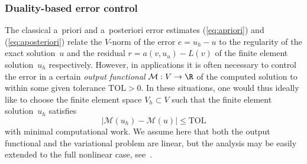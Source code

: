 \subsubsection{Duality-based error control}

The classical a~priori and a~posteriori error estimates
(\ref{eq:apriori}) and (\ref{eq:aposteriori}) relate the $V$-norm of
the error $e = u_h - u$ to the regularity of the exact solution~$u$
and the residual $r = a(v, u_u) - L(v)$ of the finite element
solution~$u_h$ respectively. However, in applications it is often
necessary to control the error in a certain \emph{output functional}
$\mathcal{M} : V \rightarrow \R$ of the computed solution to within
some given tolerance $\mathrm{TOL} > 0$. In these situations, one
would thus ideally like to choose the finite element space $V_h
\subset V$ such that the finite element solution~$u_h$ satisfies
\begin{equation}
  |\mathcal{M}(u_h) - \mathcal{M}(u)| \leq \mathrm{TOL}
\end{equation}
with minimal computational work. We assume here that both the output
functional and the variational problem are linear, but the analysis
may be easily extended to the full nonlinear case,
see~\cite{ErikssonEstepEtAl1995,BeckerRannacher2001}.

